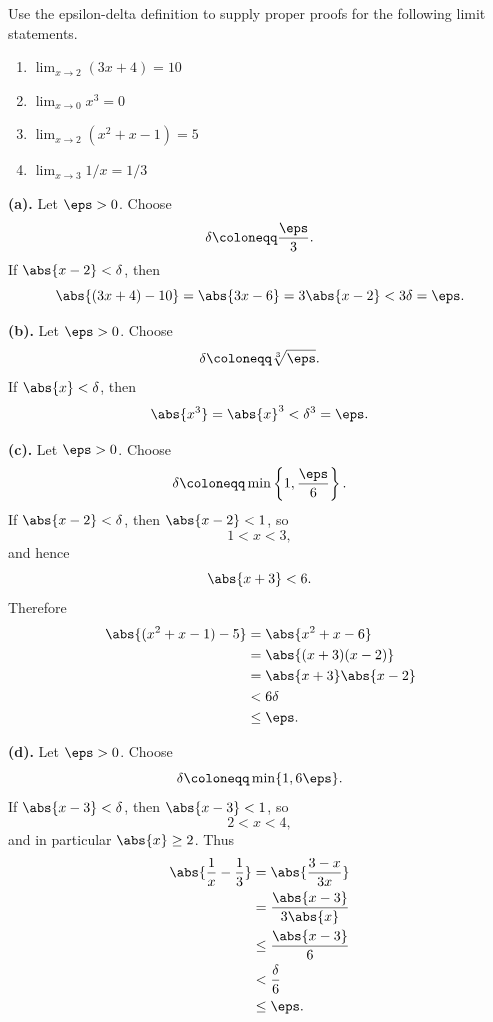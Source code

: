 \begin{problem}{
    Use the epsilon-delta definition to supply proper proofs for the following limit statements.
    \begin{enumerate}[label={(\alph*)}]
	\item $\lim_{x\to 2}(3x+4)=10$
    \item $\lim_{x\to 0}x^3=0$
    \item $\lim_{x\to 2}(x^2+x-1)=5$
    \item $\lim_{x\to 3}1/x=1/3$
    \end{enumerate}
}
    \textbf{(a).}
    Let $\eps>0$.
    Choose
    \[
        \delta \coloneqq \frac{\eps}{3}.
    \]
    If $\abs{x-2}<\delta$, then
    \[
        \abs{(3x+4)-10}
        =
        \abs{3x-6}
        =
        3\abs{x-2}
        <
        3\delta
        =
        \eps.
    \]

    \textbf{(b).}
    Let $\eps>0$.
    Choose
    \[
        \delta \coloneqq \sqrt[3]{\eps}.
    \]
    If $\abs{x}<\delta$, then
    \[
        \abs{x^3}
        =
        \abs{x}^3
        <
        \delta^3
        =
        \eps.
    \]

    \textbf{(c).}
    Let $\eps>0$.
    Choose
    \[
        \delta \coloneqq \min\left\{1,\frac{\eps}{6}\right\}.
    \]
    If $\abs{x-2}<\delta$, then $\abs{x-2}<1$, so
    \[
        1<x<3,
    \]
    and hence
    \[
        \abs{x+3}<6.
    \]
    Therefore
    \begin{align*}
        \abs{(x^2+x-1)-5}
        &=
        \abs{x^2+x-6}\\
        &=
        \abs{(x+3)(x-2)}\\
        &=
        \abs{x+3}\abs{x-2}\\
        &<
        6\delta\\
        &\leq \eps.
    \end{align*}

    \textbf{(d).}
    Let $\eps>0$.
    Choose
    \[
        \delta \coloneqq \min\{1,6\eps\}.
    \]
    If $\abs{x-3}<\delta$, then $\abs{x-3}<1$, so
    \[
        2<x<4,
    \]
    and in particular $\abs{x}\geq 2$.
    Thus
    \begin{align*}
        \abs{\frac1x-\frac13}
        &=
        \abs{\frac{3-x}{3x}}\\
        &=
        \frac{\abs{x-3}}{3\abs{x}}\\
        &\leq \frac{\abs{x-3}}{6}\\
        &<
        \frac{\delta}{6}\\
        &\leq \eps.
    \end{align*}
\end{problem}